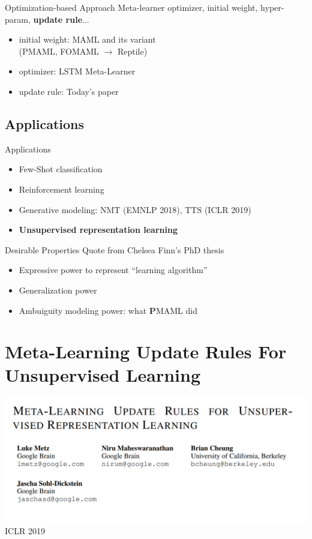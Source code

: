 \documentclass{beamer}
\begin{document}
\begin{frame}{Optimization-based Approach}
  Meta-learner optimizer, initial weight, hyper-param, \textbf{update rule}...
  \begin{itemize}
    \item initial weight: MAML and its variant\\
      (PMAML, FOMAML $\rightarrow$ Reptile)
    \item optimizer: LSTM Meta-Learner
    \item update rule: Today's paper
  \end{itemize}
\end{frame}

\subsection{Applications}

\begin{frame}{Applications}
  \begin{itemize}
    \item Few-Shot classification
    \item Reinforcement learning
    \item Generative modeling: NMT (EMNLP 2018), TTS (ICLR 2019)
    \item \textbf{Unsupervised representation learning}
  \end{itemize}
\end{frame}

\begin{frame}{Desirable Properties}
  Quote from Chelsea Finn's PhD thesis
  \begin{itemize}
    \item Expressive power to represent ``learning algorithm''
    \item Generalization power
    \item Ambuiguity modeling power: what \textbf{P}MAML did
  \end{itemize}
\end{frame}


\section{Meta-Learning Update Rules For Unsupervised Learning}
\begin{frame}
  \includegraphics[width=\textwidth]{fig/title.png}
  \center ICLR 2019
\end{frame}
\end{document}
